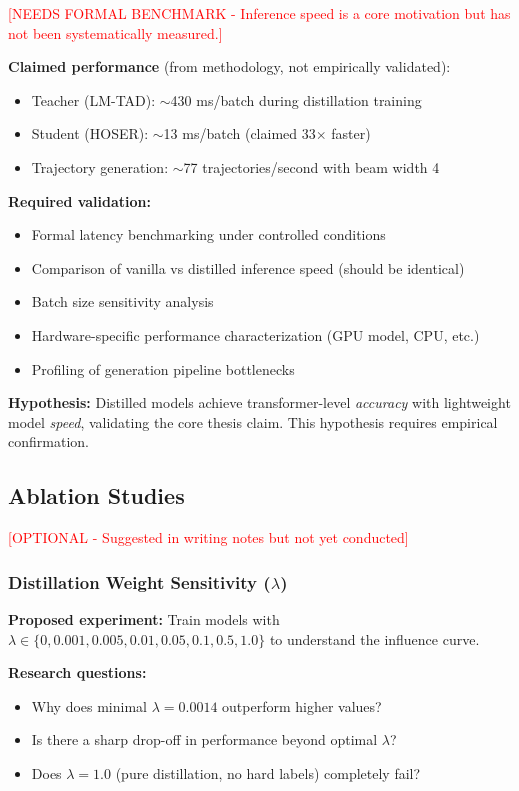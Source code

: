 \textcolor{red}{[NEEDS FORMAL BENCHMARK - Inference speed is a core motivation but has not been systematically measured.]}

\textbf{Claimed performance} (from methodology, not empirically validated):
\begin{itemize}[noitemsep,topsep=0pt]
\item Teacher (LM-TAD): $\sim$430 ms/batch during distillation training
\item Student (HOSER): $\sim$13 ms/batch (claimed 33$\times$ faster)
\item Trajectory generation: $\sim$77 trajectories/second with beam width 4
\end{itemize}

\textbf{Required validation:}
\begin{itemize}[noitemsep,topsep=0pt]
\item Formal latency benchmarking under controlled conditions
\item Comparison of vanilla vs distilled inference speed (should be identical)
\item Batch size sensitivity analysis
\item Hardware-specific performance characterization (GPU model, CPU, etc.)
\item Profiling of generation pipeline bottlenecks
\end{itemize}

\textbf{Hypothesis:} Distilled models achieve transformer-level \emph{accuracy} with lightweight model \emph{speed}, validating the core thesis claim. This hypothesis requires empirical confirmation.

\subsection{Ablation Studies}
\label{sec:eval-ablation}

\textcolor{red}{[OPTIONAL - Suggested in writing notes but not yet conducted]}

\subsubsection{Distillation Weight Sensitivity ($\lambda$)}

\textbf{Proposed experiment:} Train models with $\lambda \in \{0, 0.001, 0.005, 0.01, 0.05, 0.1, 0.5, 1.0\}$ to understand the influence curve.

\textbf{Research questions:}
\begin{itemize}[noitemsep,topsep=0pt]
\item Why does minimal $\lambda = 0.0014$ outperform higher values?
\item Is there a sharp drop-off in performance beyond optimal $\lambda$?
\item Does $\lambda = 1.0$ (pure distillation, no hard labels) completely fail?
\end{itemize}

